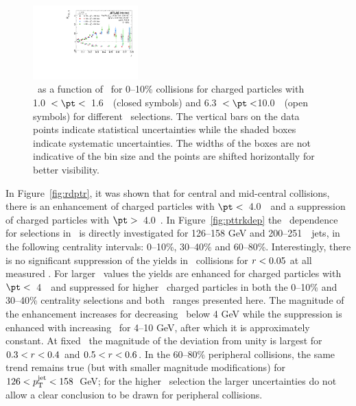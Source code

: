 \begin{figure}[ht]
\centerline{
\includegraphics[width=0.36\textwidth]{figures/results/RDpT_dR_trk3_trk6_cent0} 
}
\caption{\RDptr\ as a function of \rvar\ for 0--10\% collisions for charged particles with 1.0~$< \pt <$~1.6~\GeV\
(closed symbols) and 6.3~$< \pt <$10.0~\GeV\ (open symbols) for different \ptjet\ selections. The vertical bars on the data points indicate statistical uncertainties while the shaded boxes indicate systematic uncertainties. The widths of the boxes are not indicative of the bin size and the points are shifted horizontally for better visibility.}
\label{fig:ptjetdep}
\end{figure}


In Figure~\ref{fig:rdptr}, it was shown that for central and mid-central collisions, there is an enhancement of
charged particles with $\pt <$~4.0~\GeV\ and a suppression of charged particles with $\pt >$~4.0~\GeV.  In
Figure~\ref{fig:pttrkdep} 
the \pt\ dependence for selections in \rvar\ is directly investigated
 for 126--158 GeV and 200--251~\GeV\ jets, in the following centrality intervals: 0--10\%, 30--40\% and 60--80\%.
Interestingly, there is no significant suppression of the yields in \pbpb\ collisions
for $\mbox{$r$} < 0.05$ at all measured \pt.  For larger \rvar\ values the yields are enhanced for charged particles with $\pt <$~4~\GeV\ and 
suppressed for higher \pt\ charged particles in both the 0--10\% and 30--40\% centrality selections and both \ptjet\ 
ranges presented here.  The magnitude of the enhancement increases for decreasing \pt\ below 4 GeV while the suppression is enhanced
with increasing \pt\ for 4--10 GeV, after which it is approximately constant.
At fixed \pt\ the magnitude of the deviation from unity is largest for $0.3< \mbox{$r$} < 0.4$ and $0.5< \mbox{$r$} < 0.6$.
In the 60--80\% peripheral collisions, the same trend remains true (but with smaller magnitude 
modifications) for \mbox{$126 < \mbox{$p_{\mathrm{T}}^{\mathrm{jet}}$} < 158$ GeV}; for the higher \ptjet\ selection the larger uncertainties 
do not allow a clear conclusion to be drawn for peripheral collisions.

